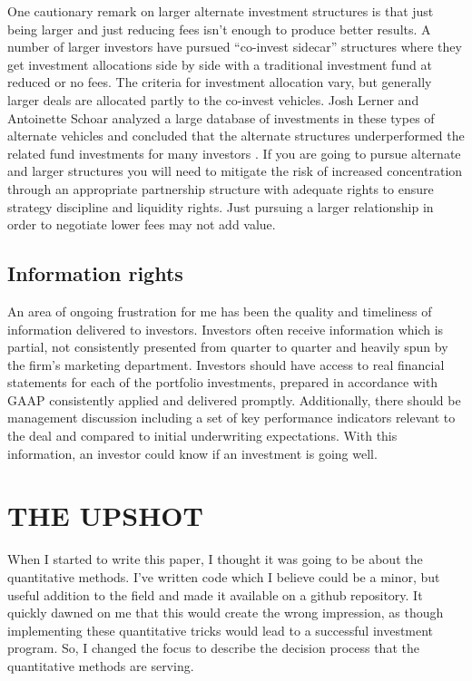 \documentclass[12pt,english]{article}\usepackage[]{graphicx}\usepackage[]{color}
\begin{document}
One cautionary remark on larger alternate investment structures is
that just being larger and just reducing fees isn't enough to produce
better results. A number of larger investors have pursued ``co-invest
sidecar'' structures where they get investment allocations side by
side with a traditional investment fund at reduced or no fees. The
criteria for investment allocation vary, but generally larger deals
are allocated partly to the co-invest vehicles. Josh Lerner and Antoinette
Schoar analyzed a large database of investments in these types of
alternate vehicles and concluded that the alternate structures underperformed
the related fund investments for many investors \parencite{Lerner2018}.
If you are going to pursue alternate and larger structures you will
need to mitigate the risk of increased concentration through an appropriate
partnership structure with adequate rights to ensure strategy discipline
and liquidity rights. Just pursuing a larger relationship in order
to negotiate lower fees may not add value.

\subsection*{Information rights}

An area of ongoing frustration for me has been the quality and timeliness
of information delivered to investors. Investors often receive information
which is partial, not consistently presented from quarter to quarter
and heavily spun by the firm's marketing department. Investors should
have access to real financial statements for each of the portfolio
investments, prepared in accordance with GAAP consistently applied
and delivered promptly. Additionally, there should be management discussion
including a set of key performance indicators relevant to the deal
and compared to initial underwriting expectations. With this information,
an investor could know if an investment is going well.

\section*{THE UPSHOT}

When I started to write this paper, I thought it was going to be about
the quantitative methods. I've written code which I believe could
be a minor, but useful addition to the field and made it available
on a github repository. It quickly dawned on me that this would create
the wrong impression, as though implementing these quantitative tricks
would lead to a successful investment program. So, I changed the focus
to describe the decision process that the quantitative methods are
serving.
\end{document}
